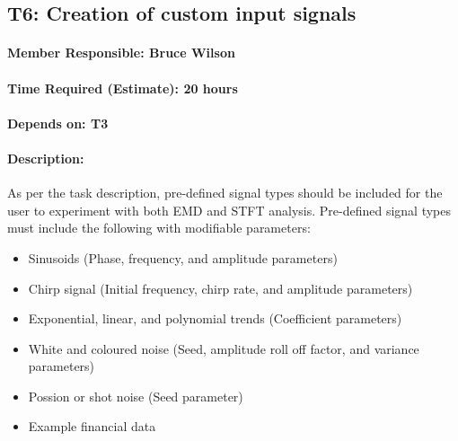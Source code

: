 \documentclass[
  english,
  paper=a4,
  oneside  ,captions=tableheading
]{scrbook}
\begin{document}
\newpage
\hypertarget{t6-creation-of-custom-input-signals}{%
\subsection{T6: Creation of custom input
signals}\label{t6-creation-of-custom-input-signals}}

\hypertarget{member-responsible-bruce-wilson-1}{%
\paragraph{Member Responsible: Bruce
Wilson}\label{member-responsible-bruce-wilson-1}}

\hypertarget{time-required-estimate-20-hours-1}{%
\paragraph{Time Required (Estimate): 20
hours}\label{time-required-estimate-20-hours-1}}

\hypertarget{depends-on-t3-1}{%
\paragraph{Depends on: T3}\label{depends-on-t3-1}}

\hypertarget{description-4}{%
\paragraph{Description:}\label{description-4}}

As per the task description, pre-defined signal types should be included
for the user to experiment with both EMD and STFT analysis. Pre-defined
signal types must include the following with modifiable parameters: 

\begin{itemize}
	\item Sinusoids (Phase, frequency, and amplitude parameters) 
	\item Chirp signal (Initial frequency, chirp rate, and amplitude parameters) 
	\item Exponential, linear, and polynomial trends (Coefficient parameters) 
	\item White and coloured noise (Seed, amplitude roll off factor, and variance parameters) 
	\item Possion or shot noise (Seed parameter) 
	\item Example financial data
\end{itemize}
\end{document}
